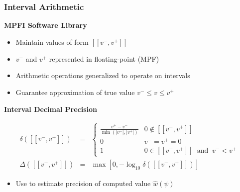 \documentclass[t,pdf]{beamer}
\newcommand{\approximate}[1]{\hat{#1}}
\newcommand{\approxw}{\approximate{w}}
\newcommand{\aerror}{\delta}
\newcommand{\decimalprecision}{\Delta}
\newcommand{\vmin}{v^{-}}
\newcommand{\vmax}{v^{+}}
\newcommand{\interval}[1]{[\![#1]\!]}
\begin{document}
\begin{frame}
\frametitle{Interval Arithmetic}

\smallskip

\textbf{MPFI Software Library}
\begin{itemize}
\item Maintain values of form $\interval{\vmin, \vmax}$
\item $\vmin$ and $\vmax$ represented in floating-point (MPF)
\item Arithmetic operations generalized to operate on intervals
\item Guarantee approximation of true value $v^{-} \leq v \leq v^{+}$
\end{itemize}

\smallskip

\textbf{Interval Decimal Precision}

\vskip -10pt

\begin{eqnarray*}
\aerror(\interval{\vmin, \vmax}) & = & \left\{ \begin{array}{ll}
  \frac{\vmax - \vmin}{\min(|\vmin|, |\vmax|)}  & 0 \not \in \interval{\vmin, \vmax}\\[0.8em]
  0 & \vmin = \vmax = 0 \\
  1 & 0 \in \interval{\vmin, \vmax} \;\; \textrm{and} \;\; \vmin < \vmax
  \end{array} \right.\\[0.5em]
\decimalprecision(\interval{\vmin, \vmax})  & = &  \max[0, -\log_{10} \aerror(\interval{\vmin, \vmax})]
\end{eqnarray*}

\begin{itemize}
  \item Use to estimate precision of computed value $\approxw(\psi)$
\end{itemize}

\end{frame}
\end{document}
